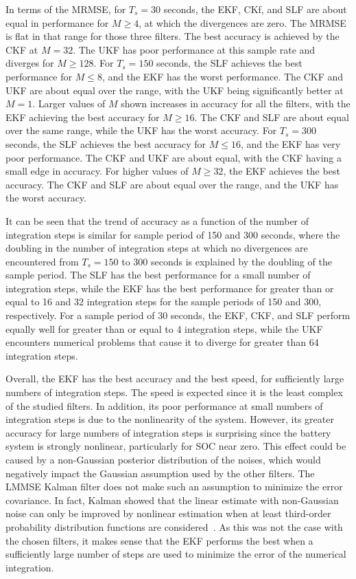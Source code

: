 \documentclass[../zhang_thesis.tex]{subfiles}
\begin{document}
In terms of the MRMSE, for $T_s=30$ seconds, the EKF, CKf, and SLF are about equal in performance for $M\ge 4$, at which the divergences are zero. The MRMSE is flat in that range for those three filters. The best accuracy is achieved by the CKF at $M=32$. The UKF has poor performance at this sample rate and diverges for $M\ge 128$. For $T_s=150$ seconds, the SLF achieves the best performance for $M\le 8$, and the EKF has the worst performance. The CKF and UKF are about equal over the
range, with the UKF being significantly better at $M=1$. Larger values of $M$ shown increases in accuracy for all the filters, with the EKF achieving the best accuracy for $M\ge 16$. The CKF and SLF are about equal over the same range, while the UKF has the worst accuracy. For $T_s=300$ seconds, the SLF achieves the best accuracy for $M\le 16$, and the EKF has very poor performance. The CKF and UKF are about equal, with the CKF having a small edge in accuracy. For higher values of $M\ge
32$, the EKF achieves the best accuracy. The CKF and SLF are about equal over the range, and the UKF has the worst accuracy.

It can be seen that the trend of accuracy as a function of the number of integration steps is similar for sample period of 150 and 300 seconds, where the doubling in the number of integration steps at which no divergences are encountered from $T_s=150$ to 300 seconds is explained by the doubling of the sample period. The SLF has the best performance for a small number of integration steps, while the EKF has the best performance for greater than or equal to 16 and 32 integration steps for the sample
periods of 150 and 300, respectively. For a sample period of 30 seconds, the EKF, CKF, and SLF perform equally well for greater than or equal to 4 integration steps, while the UKF encounters numerical problems that cause it to diverge for greater than 64 integration steps.

Overall, the EKF has the best accuracy and the best speed, for sufficiently large numbers of integration steps. The speed is expected since it is the least complex of the studied filters. In addition, its poor performance at small numbers of integration steps is due to the nonlinearity of the system. However, its greater accuracy for large numbers of integration steps is surprising since the battery system is strongly nonlinear, particularly for SOC near zero. This effect could be
caused by a non-Gaussian posterior distribution of the noises, which would negatively impact the Gaussian assumption used by the other filters. The LMMSE Kalman filter does not make such an assumption to minimize the error covariance. In fact, Kalman showed that the linear estimate with non-Gaussian noise can only be improved by nonlinear estimation when at least third-order probability distribution functions are considered~\cite{kalman60}. As this was not the case with the chosen filters, it
makes sense that the EKF performs the best when a sufficiently large number of steps are used to minimize the error of the numerical integration.
\end{document}
